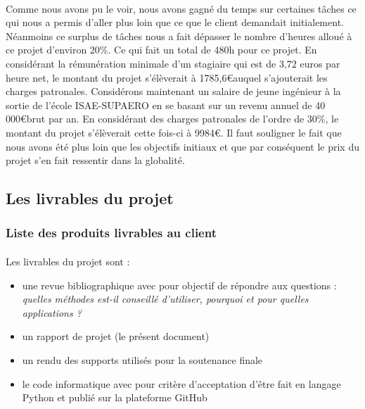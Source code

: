     \paragraph{}
    Comme nous avons pu le voir, nous avons gagné du temps sur certaines tâches ce qui nous a permis d'aller plus loin que ce que le client demandait initialement. Néanmoins ce surplus de tâches nous a fait dépasser le nombre d'heures alloué à ce projet d'environ 20\%. Ce qui fait un total de 480h pour ce projet. En considérant la rémunération minimale d'un stagiaire qui est de 3,72 euros par heure net, le montant du projet s'élèverait à 1785,6\euro auquel s'ajouterait les charges patronales. Considérons maintenant un salaire de jeune ingénieur à la sortie de l'école ISAE-SUPAERO en se basant sur un revenu annuel de 40 000\euro brut par an. En considérant des charges patronales de l'ordre de 30\%, le montant du projet s'élèverait cette fois-ci à 9984\euro. Il faut souligner le fait que nous avons été plus loin que les objectifs initiaux et que par conséquent le prix du projet s'en fait ressentir dans la globalité.


\subsection{Les livrables du projet}

    \subsubsection{Liste des produits livrables au client}
        \paragraph{}
        Les livrables du projet sont :
        \begin{itemize}
            \item une revue bibliographique avec pour objectif de répondre aux questions : \textit{quelles méthodes est-il conseillé d'utiliser, pourquoi et pour quelles applications ?}
            \item un rapport de projet (le présent document)
            \item un rendu des supports utilisés pour la soutenance finale
            \item le code informatique avec pour critère d'acceptation d'être fait en langage Python et publié sur la plateforme GitHub
        \end{itemize}

